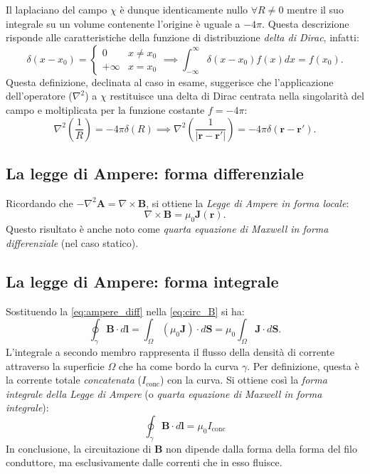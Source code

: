 \documentclass[a4paper,11pt]{report}
\begin{document}
\begin{approfondimento}[colback= white, colframe=green!35!black, no shadow, title={Calcolo del laplaciano del potenziale vettore}]
Il laplaciano del campo $\chi$ è dunque identicamente nullo $\forall R \neq 0$ mentre il suo integrale su un volume contenente l'origine è uguale a $-4\pi$. Questa descrizione risponde alle caratteristiche della funzione di distribuzione \textit{delta di Dirac}, infatti: 
\[
\delta(x - x_0) = 
\begin{cases}
0 &  x \neq x_0 \\
+\infty & x = x_0 
\end{cases}
\implies \int_{-\infty}^{\infty} \delta(x-x_0)f(x) dx = f(x_0).
\]
Questa definizione, declinata al caso in esame, suggerisce che l'applicazione dell'operatore ($\nabla^2$) a $\chi$ restituisce una delta di Dirac centrata nella singolarità del campo e moltiplicata per la funzione costante $f = -4\pi$:
\begin{equation}
\nabla^2\left(\frac{1}{R}\right) = -4\pi \delta(R) \implies \nabla^2\left(\frac{1}{|\bm{r}-\bm{r}'|}\right) = -4\pi\delta(\bm{r}-\bm{r}').
\end{equation}


\end{approfondimento}


\subsection{La legge di Ampere: forma differenziale}
Ricordando che $-\nabla^2\bm{A} = \nabla \times \bm{B}$, si ottiene la \textit{Legge di Ampere in forma locale}:
\begin{equation}
   \nabla \times \bm{B} = \mu_0 \bm{J}(\bm{r}).
   \label{eq:ampere_diff}
\end{equation}
Questo risultato è anche noto come \textit{quarta equazione di Maxwell in forma differenziale} (nel caso statico).

\subsection{La legge di Ampere: forma integrale}
Sostituendo la \eqref{eq:ampere_diff} nella \eqref{eq:circ_B} si ha:
\begin{equation}
    \oint_\gamma \bm{B}\cdot d\bm{l} = \int_{\Omega} (\mu_0 \bm{J}) \cdot d\bm{S} = \mu_0 \int_{\Omega} \bm{J} \cdot d\bm{S}.
\end{equation}
L'integrale a secondo membro rappresenta il flusso della densità di corrente attraverso la superficie $\Omega$ che ha come bordo la curva $\gamma$. Per definizione, questa è la corrente totale \textit{concatenata} ($I_{\text{conc}}$) con la curva.
Si ottiene così la \textit{forma integrale della Legge di Ampere} (o \textit{quarta equazione di Maxwell in forma integrale}):
\begin{equation}
    {
    \oint_\gamma \bm{B}\cdot d\bm{l} = \mu_0 I_{\text{conc}}
    }
\end{equation}
In conclusione, la circuitazione di $\bm{B}$ non dipende dalla forma della forma del filo conduttore, ma esclusivamente dalle correnti che in esso fluisce. 
\end{document}
